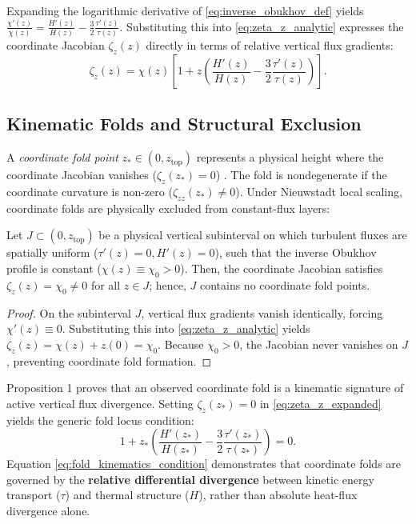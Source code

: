 Expanding the logarithmic derivative of \eqref{eq:inverse_obukhov_def} yields $\frac{\chi'(z)}{\chi(z)} = \frac{H'(z)}{H(z)} - \frac{3}{2}\frac{\tau'(z)}{\tau(z)}$. Substituting this into \eqref{eq:zeta_z_analytic} expresses the coordinate Jacobian $\zeta_z(z)$ directly in terms of relative vertical flux gradients:
\begin{equation}
    \zeta_z(z) = \chi(z) \left[ 1 + z \left( \frac{H'(z)}{H(z)} - \frac{3}{2}\frac{\tau'(z)}{\tau(z)} \right) \right]. \label{eq:zeta_z_expanded}
\end{equation}

\subsection{Kinematic Folds and Structural Exclusion}

A \textit{coordinate fold point} $z_* \in (0, z_{\text{top}})$ represents a physical height where the coordinate Jacobian vanishes ($\zeta_z(z_*) = 0$) \cite{fenichel1979}. The fold is nondegenerate if the coordinate curvature is non-zero ($\zeta_{zz}(z_*) \neq 0$). Under Nieuwstadt local scaling, coordinate folds are physically excluded from constant-flux layers:

\begin{proposition}
Let $J \subset (0, z_{\text{top}})$ be a physical vertical subinterval on which turbulent fluxes are spatially uniform ($\tau'(z) = 0, H'(z) = 0$), such that the inverse Obukhov profile is constant ($\chi(z) \equiv \chi_0 > 0$). Then, the coordinate Jacobian satisfies $\zeta_z(z) = \chi_0 \neq 0$ for all $z \in J$; hence, $J$ contains no coordinate fold points.
\end{proposition}

\begin{proof}
On the subinterval $J$, vertical flux gradients vanish identically, forcing $\chi'(z) \equiv 0$. Substituting this into \eqref{eq:zeta_z_analytic} yields $\zeta_z(z) = \chi(z) + z(0) = \chi_0$. Because $\chi_0 > 0$, the Jacobian never vanishes on $J$, preventing coordinate fold formation.
\end{proof}

Proposition 1 proves that an observed coordinate fold is a kinematic signature of active vertical flux divergence. Setting $\zeta_z(z_*) = 0$ in \eqref{eq:zeta_z_expanded} yields the generic fold locus condition:
\begin{equation}
    1 + z_* \left( \frac{H'(z_*)}{H(z_*)} - \frac{3}{2}\frac{\tau'(z_*)}{\tau(z_*)} \right) = 0. \label{eq:fold_kinematics_condition}
\end{equation}
Equation \eqref{eq:fold_kinematics_condition} demonstrates that coordinate folds are governed by the \textbf{relative differential divergence} between kinetic energy transport ($\tau$) and thermal structure ($H$), rather than absolute heat-flux divergence alone.


